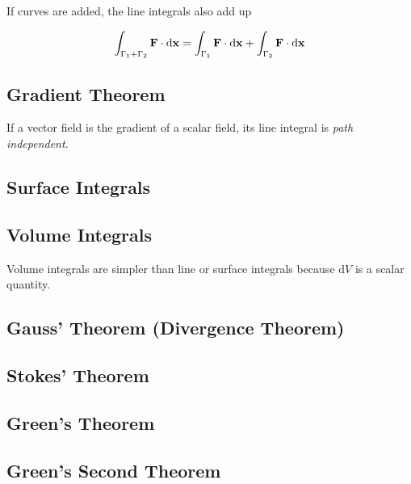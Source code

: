 If curves are added, the line integrals also add up

\begin{equation*}
    \int_{\Gamma_1 + \Gamma_2} \mathbf{F} \cdot \differential \mathbf{x} = \int_{\Gamma_1} \mathbf{F} \cdot \differential \mathbf{x} + \int_{\Gamma_2} \mathbf{F} \cdot \differential \mathbf{x}
\end{equation*}

\subsection*{Gradient Theorem}

If a vector field is the gradient of a scalar field, its line integral is \textit{path independent}.

\subsection*{Surface Integrals}
\subsection*{Volume Integrals}
Volume integrals are simpler than line or surface integrals because $\mathrm{d}V$ is a scalar quantity.

\subsection*{Gauss' Theorem (Divergence Theorem)}
\subsection*{Stokes' Theorem}
\subsection*{Green's Theorem}
\subsection*{Green's Second Theorem}